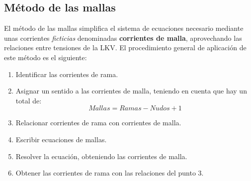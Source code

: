 	\subsection{Método de las mallas}
        \label{sec:mallas}
	El método de las mallas simplifica el sistema de ecuaciones
        necesario mediante unas corrientes \emph{ficticias}
        denominadas \textbf{corrientes de malla}, aprovechando las
        relaciones entre tensiones de la LKV. El procedimiento general
        de aplicación de este método es el siguiente:
	\begin{enumerate}
        \item Identificar las corrientes de rama.
        \item Asignar un sentido a las corrientes de malla, teniendo
          en cuenta que hay un total de:
          \begin{equation*} {Mallas=Ramas-Nudos+1}
          \end{equation*}
        \item Relacionar corrientes de rama con corrientes de malla.
        \item Escribir ecuaciones de mallas.
        \item Resolver la ecuación, obteniendo las corrientes de
          malla.
        \item Obtener las corrientes de rama con las relaciones del
          punto 3.
	\end{enumerate}
	
